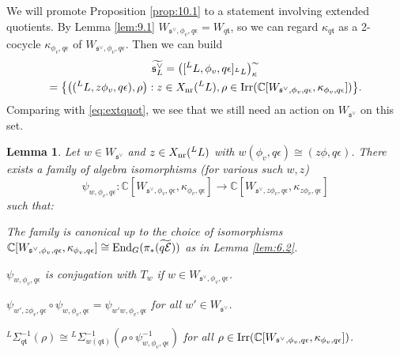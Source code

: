 \documentclass[11pt]{amsart}
\newtheorem{lem}[thm]{Lemma}
\theoremstyle{definition}
\newcommand{\enuma}[1]{\begin{enumerate}[\textup{(}a\textup{)}] {#1} \end{enumerate}}
\newcommand{\C}{\mathbb C}
\def\End{{\rm End}}
\def\Irr{{\rm Irr}}
\def\cE{{\mathcal E}}
\def\nr{{\rm nr}}
\def\fs{{\mathfrak s}}
\def\ft{{\mathfrak t}}
\begin{document}
We will promote Proposition \ref{prop:10.1} to a statement involving extended
quotients. By Lemma \ref{lem:9.1} $W_{\fs^\vee,\phi_v,q \epsilon} = W_{q \ft}$, so we 
can regard $\kappa_{q \ft}$ as a 2-cocycle $\kappa_{\phi_v,q \epsilon}$ of 
$W_{\fs^\vee,\phi_v,q \epsilon}$. Then we can build 
\begin{multline*}
\widetilde{\fs^\vee_L} = \big( [{}^L L, \phi_v, q \epsilon]_{{}^L L} \big)^\sim_\kappa \\
= \big\{ \big( ({}^L L, z \phi_v, q \epsilon), \rho \big) : z \in X_\nr ({}^L L),
\rho \in \Irr (\C [W_{\fs^\vee,\phi_v,q \epsilon}, \kappa_{\phi_v,q \epsilon}]) \big\} .
\end{multline*}
Comparing with \eqref{eq:extquot}, we see that we still need an action on
$W_{\fs^\vee}$ on this set. 

\begin{lem}\label{lem:10.2}
Let $w \in W_{\fs^\vee}$ and $z \in X_\nr ({}^L L)$ with $w (\phi_v,q \epsilon) \cong
(z \phi, q \epsilon)$. There exists a family of algebra isomorphisms (for various
such $w,z$)
\[
\psi_{w,\phi_v,q \epsilon} : \C [W_{\fs^\vee,\phi_v,q \epsilon}, \kappa_{\phi_v,q \epsilon}]
\to \C [W_{\fs^\vee,z \phi_v,q \epsilon}, \kappa_{z \phi_v,q \epsilon}]
\]
such that:
\enuma{
\item The family is canonical up to the choice of isomorphisms
$\C [W_{\fs^\vee,\phi_v,q \epsilon}, \kappa_{\phi_v,q \epsilon}] \cong
\End_G (\pi_* (\widetilde{q \cE}))$ as in Lemma \ref{lem:6.2}.
\item $\psi_{w,\phi_v,q \epsilon}$ is conjugation with $T_w$ if 
$w \in W_{\fs^\vee,\phi_v,q \epsilon}$.
\item $\psi_{w',z \phi_v,q \epsilon} \circ \psi_{w,\phi_v,q \epsilon} =
\psi_{w' w,\phi_v,q \epsilon}$ for all $w' \in W_{\fs^\vee}$.
\item ${}^L \Sigma_{q \ft}^{-1}(\rho) \cong {}^L \Sigma_{w (q \ft)}^{-1}
(\rho \circ \psi_{w,\phi_v,q \epsilon}^{-1} )$ for all $\rho \in
\Irr (\C [W_{\fs^\vee,\phi_v,q \epsilon}, \kappa_{\phi_v,q \epsilon}])$.
}
\end{lem}
\end{document}
